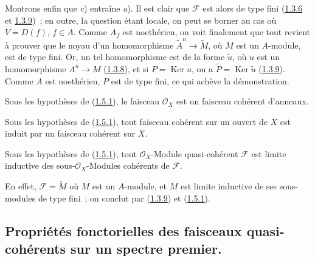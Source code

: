 Montrons enfin que \textit{c}) entraîne \textit{a}). Il est clair que
$\mathscr{F}$ est alors de type fini
(\hyperref[I.1.3.6-fr]{1.3.6} et \hyperref[I.1.3.9-fr]{1.3.9})~; en outre,
la question étant locale, on peut se borner au cas où $V=D(f)$, $f\in A$.
Comme $A_f$ est noethérien, on voit finalement que tout revient à prouver
que le noyau d'un homomorphisme $\widetilde{A}^n\to\widetilde{M}$, où $M$
est un $A$-module, est de type fini. Or, un tel homomorphisme est de la
forme $\widetilde{u}$, où $u$ est un homomorphisme $A^n\to M$
(\hyperref[I.1.3.8-fr]{1.3.8}), et si $P=\operatorname{Ker}u$, on a
$\widetilde{P}=\operatorname{Ker}\widetilde{u}$
(\hyperref[I.1.3.9-fr]{1.3.9}). Comme $A$ est noethérien, $P$ est de type
fini, ce qui achève la démonstration.

\begin{corollary}[1.5.2]
\label{I.1.5.2-fr}
Sous les hypothèses de \textup{(\hyperref[I.1.5.1-fr]{1.5.1})}, le faisceau
$\mathscr{O}_X$ est un faisceau cohérent d'anneaux.
\end{corollary}

\begin{corollary}[1.5.3]
\label{I.1.5.3-fr}
Sous les hypothèses de \textup{(\hyperref[I.1.5.1-fr]{1.5.1})}, tout faisceau
cohérent sur un ouvert de $X$ est induit par un faisceau cohérent sur $X$.
\end{corollary}

\begin{corollary}[1.5.4]
\label{I.1.5.4-fr}
Sous les hypothèses de \textup{(\hyperref[I.1.5.1-fr]{1.5.1})}, tout
$\mathscr{O}_X$-Module quasi-cohérent $\mathscr{F}$ est limite inductive
des sous-$\mathscr{O}_X$-Modules cohérents de $\mathscr{F}$.
\end{corollary}

En effet, $\mathscr{F}=\widetilde{M}$ où $M$ est un $A$-module, et $M$ est
limite inductive de ses sous-modules de type fini~; on conclut par
(\hyperref[I.1.3.9-fr]{1.3.9}) et
(\hyperref[I.1.5.1-fr]{1.5.1}).

\subsection{Propriétés fonctorielles des faisceaux quasi-cohérents sur un
spectre premier.}
\label{subsection:I.1.6-fr}

